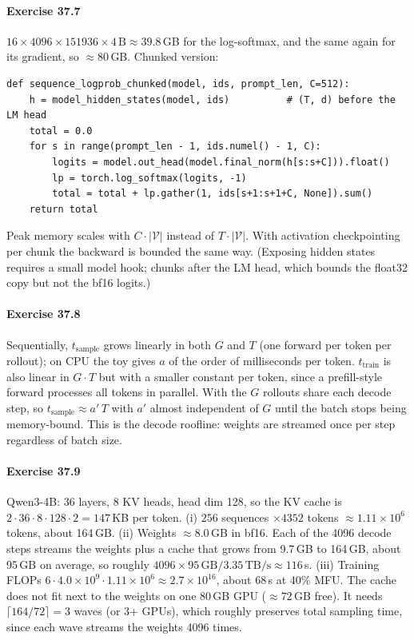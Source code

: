 \paragraph{Exercise 37.7} $16\times4096\times\num{151936}\times4\,\text{B}\approx39.8$\,GB for
the log-softmax, and the same again for its gradient, so $\approx80$\,GB. Chunked version:
\begin{lstlisting}
def sequence_logprob_chunked(model, ids, prompt_len, C=512):
    h = model_hidden_states(model, ids)          # (T, d) before the LM head
    total = 0.0
    for s in range(prompt_len - 1, ids.numel() - 1, C):
        logits = model.out_head(model.final_norm(h[s:s+C])).float()
        lp = torch.log_softmax(logits, -1)
        total = total + lp.gather(1, ids[s+1:s+1+C, None]).sum()
    return total
\end{lstlisting}
Peak memory scales with $C\cdot|\mathcal V|$ instead of $T\cdot|\mathcal V|$. With
activation checkpointing per chunk the backward is bounded the same way. (Exposing hidden
states requires a small model hook;  chunks
after the LM head, which bounds the float32 copy but not the bf16 logits.)

\paragraph{Exercise 37.8} Sequentially, $t_{\text{sample}}$ grows linearly in both $G$ and $T$
(one forward per token per rollout); on CPU the toy gives $a$ of the order of milliseconds per
token. $t_{\text{train}}$ is also linear in $G\cdot T$ but with a smaller constant per token,
since a prefill-style forward processes all tokens in parallel. With 
the $G$ rollouts share each decode step, so $t_{\text{sample}}\approx a'\,T$ with $a'$ almost
independent of $G$ until the batch stops being memory-bound. This is the decode roofline:
weights are streamed once per step regardless of batch size.

\paragraph{Exercise 37.9} Qwen3-4B: 36 layers, 8 KV heads, head dim 128, so the KV cache is
$2\cdot36\cdot8\cdot128\cdot2=147$\,KB per token. (i) $256$ sequences $\times4352$ tokens
$\approx1.11\times10^6$ tokens, about 164\,GB. (ii) Weights $\approx8.0$\,GB in bf16. Each of the
4096 decode steps streams the weights plus a cache that grows from 9.7\,GB to 164\,GB, about
95\,GB on average, so roughly $4096\times95\,\text{GB}/3.35\,\text{TB/s}\approx116$\,s.
(iii) Training FLOPs $6\cdot4.0\times10^9\cdot1.11\times10^6\approx2.7\times10^{16}$, about 68\,s at
40\% MFU. The cache does not fit next to the weights on one 80\,GB GPU ($\approx72$\,GB free).
It needs $\lceil164/72\rceil=3$ waves (or 3+ GPUs), which roughly preserves total sampling
time, since each wave streams the weights 4096 times.

